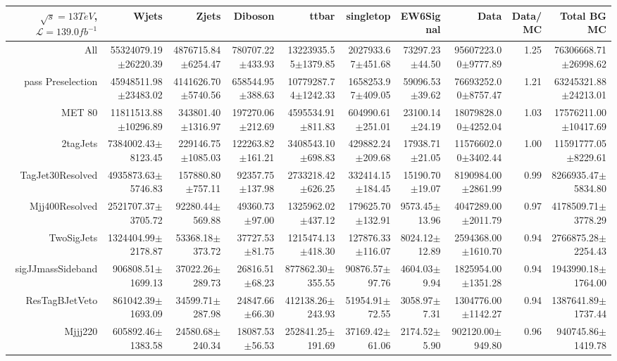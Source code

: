  \begin{tabular}{ r ||  r  r  r  r  r  r || r r r |} 
 \ensuremath{\sqrt{s}=13 TeV}, \ensuremath{\mathcal{L}=139.0 fb^{-1}}  & Wjets & Zjets & Diboson & ttbar & singletop & EW6Signal& Data & Data/MC & Total BG MC \tabularnewline 
 \hline 
All & 55324079.19$\pm$26220.39 & 4876715.84$\pm$6254.47 & 780707.22$\pm$433.93 & 13223935.55$\pm$1379.85 & 2027933.67$\pm$451.68 & 73297.23$\pm$44.50 & 95607223.00$\pm$9777.89 & 1.25 & 76306668.71$\pm$26998.62\tabularnewline \hline 
pass Preselection & 45948511.98$\pm$23483.02 & 4141626.70$\pm$5740.56 & 658544.95$\pm$388.63 & 10779287.74$\pm$1242.33 & 1658253.97$\pm$409.05 & 59096.53$\pm$39.62 & 76693252.00$\pm$8757.47 & 1.21 & 63245321.88$\pm$24213.01\tabularnewline \hline 
MET 80 & 11811513.88$\pm$10296.89 & 343801.40$\pm$1316.97 & 197270.06$\pm$212.69 & 4595534.91$\pm$811.83 & 604990.61$\pm$251.01 & 23100.14$\pm$24.19 & 18079828.00$\pm$4252.04 & 1.03 & 17576211.00$\pm$10417.69\tabularnewline \hline 
2tagJets & 7384002.43$\pm$8123.45 & 229146.75$\pm$1085.03 & 122263.82$\pm$161.21 & 3408543.10$\pm$698.83 & 429882.24$\pm$209.68 & 17938.71$\pm$21.05 & 11576602.00$\pm$3402.44 & 1.00 & 11591777.05$\pm$8229.61\tabularnewline \hline 
TagJet30Resolved & 4935873.63$\pm$5746.83 & 157880.80$\pm$757.11 & 92357.75$\pm$137.98 & 2733218.42$\pm$626.25 & 332414.15$\pm$184.45 & 15190.70$\pm$19.07 & 8190984.00$\pm$2861.99 & 0.99 & 8266935.47$\pm$5834.80\tabularnewline \hline 
Mjj400Resolved & 2521707.37$\pm$3705.72 & 92280.44$\pm$569.88 & 49360.73$\pm$97.00 & 1325962.02$\pm$437.12 & 179625.70$\pm$132.91 & 9573.45$\pm$13.96 & 4047289.00$\pm$2011.79 & 0.97 & 4178509.71$\pm$3778.29\tabularnewline \hline 
TwoSigJets & 1324404.99$\pm$2178.87 & 53368.18$\pm$373.72 & 37727.53$\pm$81.75 & 1215474.13$\pm$418.30 & 127876.33$\pm$116.07 & 8024.12$\pm$12.89 & 2594368.00$\pm$1610.70 & 0.94 & 2766875.28$\pm$2254.43\tabularnewline \hline 
sigJJmassSideband & 906808.51$\pm$1699.13 & 37022.26$\pm$289.73 & 26816.51$\pm$68.23 & 877862.30$\pm$355.55 & 90876.57$\pm$97.76 & 4604.03$\pm$9.94 & 1825954.00$\pm$1351.28 & 0.94 & 1943990.18$\pm$1764.00\tabularnewline \hline 
ResTagBJetVeto & 861042.39$\pm$1693.09 & 34599.71$\pm$287.98 & 24847.66$\pm$66.30 & 412138.26$\pm$243.93 & 51954.91$\pm$72.55 & 3058.97$\pm$7.31 & 1304776.00$\pm$1142.27 & 0.94 & 1387641.89$\pm$1737.44\tabularnewline \hline 
Mjjj220 & 605892.46$\pm$1383.58 & 24580.68$\pm$240.34 & 18087.53$\pm$56.53 & 252841.25$\pm$191.69 & 37169.42$\pm$61.06 & 2174.52$\pm$5.90 & 902120.00$\pm$949.80 & 0.96 & 940745.86$\pm$1419.78\tabularnewline \hline 
\end{tabular}
